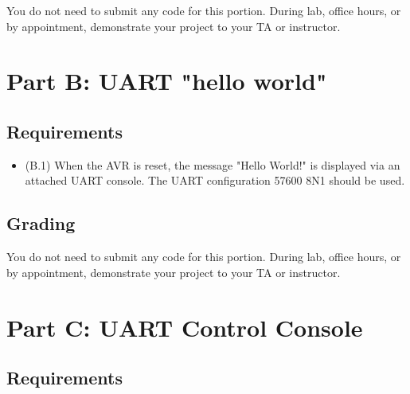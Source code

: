 \documentclass{article}
\begin{document}
You do not need to submit any code for this portion. During lab, office hours,
or by appointment, demonstrate your project to your TA or instructor.

\section{Part B: UART "hello world"}

\subsection{Requirements}

\begin{itemize}

	\item (B.1) When the AVR is reset, the message "Hello World!" is
	displayed via an attached UART console. The UART configuration
	57600 8N1 should be used.

\end{itemize}

\subsection{Grading}

You do not need to submit any code for this portion. During lab, office hours,
or by appointment, demonstrate your project to your TA or instructor.

\section{Part C: UART Control Console}

\subsection{Requirements}
\end{document}
